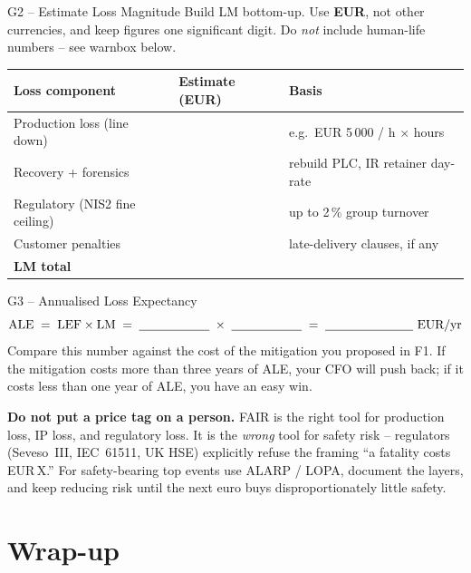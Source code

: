 \documentclass[11pt,a4paper]{article}
\begin{document}
\begin{stepbox}{G2 -- Estimate Loss Magnitude}
Build LM bottom-up. Use \textbf{EUR}, not other currencies, and keep figures one significant digit. Do \emph{not} include human-life numbers -- see warnbox below.

\medskip
\begin{tabular}{|p{55mm}|p{30mm}|p{55mm}|}
\hline
\textbf{Loss component} & \textbf{Estimate (EUR)} & \textbf{Basis} \\
\hline
Production loss (line down)        & & e.g.\ EUR 5\,000 / h $\times$ hours \\
\hline
Recovery + forensics               & & rebuild PLC, IR retainer day-rate \\
\hline
Regulatory (NIS2 fine ceiling)     & & up to 2\,\% group turnover \\
\hline
Customer penalties                 & & late-delivery clauses, if any \\
\hline
\textbf{LM total}                  & & \\
\hline
\end{tabular}
\end{stepbox}

\begin{stepbox}{G3 -- Annualised Loss Expectancy}
\[
\text{ALE} \;=\; \text{LEF} \times \text{LM} \;=\; \underline{\hspace{20mm}} \; \times \; \underline{\hspace{20mm}} \; = \; \underline{\hspace{25mm}}\ \text{EUR/yr}
\]
Compare this number against the cost of the mitigation you proposed in F1. If the mitigation costs more than three years of ALE, your CFO will push back; if it costs less than one year of ALE, you have an easy win.
\end{stepbox}

\begin{warnbox}
\textbf{Do not put a price tag on a person.} FAIR is the right tool for production loss, IP loss, and regulatory loss. It is the \emph{wrong} tool for safety risk -- regulators (Seveso~III, IEC~61511, UK HSE) explicitly refuse the framing ``a fatality costs EUR\,X.'' For safety-bearing top events use ALARP / LOPA, document the layers, and keep reducing risk until the next euro buys disproportionately little safety.
\end{warnbox}

\section*{Wrap-up}
\end{document}
